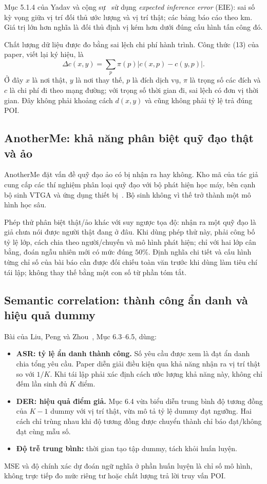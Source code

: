 \documentclass[12pt,a4paper,oneside]{report}
\begin{document}
Mục 5.1.4 của Yadav và cộng sự~\citep{yadav2024transprotect} sử dụng \emph{expected inference error} (EIE): sai số kỳ vọng giữa vị trí đối thủ ước lượng và vị trí thật; các bảng báo cáo theo km. Giá trị lớn hơn nghĩa là đối thủ định vị kém hơn dưới đúng cấu hình tấn công đó.

Chất lượng dữ liệu được đo bằng sai lệch chi phí hành trình. Công thức (13) của paper, viết lại ký hiệu, là
\[
\Delta c(x,y)=\sum_{p}\pi(p)\left|c(x,p)-c(y,p)\right|.
\]
Ở đây $x$ là nơi thật, $y$ là nơi thay thế, $p$ là đích dịch vụ, $\pi$ là trọng số các đích và $c$ là chi phí đi theo mạng đường; với trọng số thời gian đi, sai lệch có đơn vị thời gian. Đây không phải khoảng cách $d(x,y)$ và cũng không phải tỷ lệ trả đúng POI.

\subsection{AnotherMe: khả năng phân biệt quỹ đạo thật và ảo}

AnotherMe đặt vấn đề quỹ đạo ảo có bị nhận ra hay không. Kho mã của tác giả cung cấp các thí nghiệm phân loại quỹ đạo với bộ phát hiện học máy, bên cạnh bộ sinh VTGA và ứng dụng thiết bị~\citep{anothermecode}. Bộ sinh không vì thế trở thành một mô hình học sâu.

Phép thử phân biệt thật/ảo khác với suy ngược tọa độ: nhận ra một quỹ đạo là giả chưa nói được người thật đang ở đâu. Khi dùng phép thử này, phải công bố tỷ lệ lớp, cách chia theo người/chuyến và mô hình phát hiện; chỉ với hai lớp cân bằng, đoán ngẫu nhiên mới có mức đúng $50\%$. Định nghĩa chi tiết và cấu hình từng chỉ số của bài báo cần được đối chiếu toàn văn trước khi dùng làm tiêu chí tái lập; không thay thế bằng một con số từ phần tóm tắt.

\subsection{Semantic correlation: thành công ẩn danh và hiệu quả dummy}

Bài của Liu, Peng và Zhou~\citep{liu2026semantic}, Mục 6.3--6.5, dùng:
\begin{itemize}
  \item \textbf{ASR: tỷ lệ ẩn danh thành công.} Số yêu cầu được xem là đạt ẩn danh chia tổng yêu cầu. Paper diễn giải điều kiện qua khả năng nhận ra vị trí thật so với $1/K$. Khi tái lập phải xác định cách ước lượng khả năng này, không chỉ đếm lần sinh đủ $K$ điểm.
  \item \textbf{DER: hiệu quả điểm giả.} Mục 6.4 vừa biểu diễn trung bình độ tương đồng của $K-1$ dummy với vị trí thật, vừa mô tả tỷ lệ dummy đạt ngưỡng. Hai cách chỉ trùng nhau khi độ tương đồng được chuyển thành chỉ báo đạt/không đạt cùng mẫu số.
  \item \textbf{Độ trễ trung bình:} thời gian tạo tập dummy, tách khỏi huấn luyện.
\end{itemize}
MSE và độ chính xác dự đoán ngữ nghĩa ở phần huấn luyện là chỉ số mô hình, không trực tiếp đo mức riêng tư hoặc chất lượng trả lời truy vấn POI.
\end{document}
